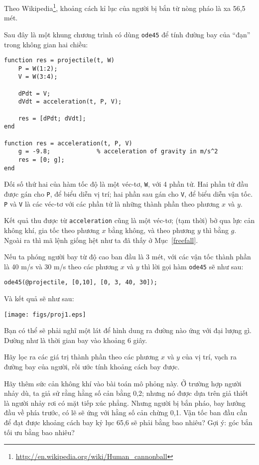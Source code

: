 \documentclass[12pt]{book}
\begin{document}
Theo Wikipedia\footnote{\url{http://en.wikipedia.org/wiki/Human_cannonball}},
khoảng cách kỉ lục của người bị bắn từ nòng pháo là xa 56,5 mét.

Sau đây là một khung chương trình có dùng {\tt ode45} để tính đường bay của ``đạn'' trong
không gian hai chiều:

\begin{verbatim}
function res = projectile(t, W)
    P = W(1:2);
    V = W(3:4);

    dPdt = V;                          
    dVdt = acceleration(t, P, V);

    res = [dPdt; dVdt];
end

function res = acceleration(t, P, V)
    g = -9.8;             % acceleration of gravity in m/s^2
    res = [0; g];
end
\end{verbatim}
%
Đối số thứ hai của hàm tốc độ là một véc-tơ, {\tt W}, với
4 phần tử. Hai phần tử đầu được gán cho {\tt P}, để biểu
diễn vị trí; hai phần sau gán cho {\tt V}, để biểu diễn
vận tốc. {\tt P} và {\tt V} là các véc-tơ với các phần tử
là những thành phần theo phương $x$ và $y$.

Kết quả thu được từ {\tt acceleration} cũng là một véc-tơ; 
(tạm thời) bở qua lực cản không khí, gia tốc theo phương
$x$ bằng không, và theo phương $y$ thì bằng $g$. 
Ngoài ra thì mã lệnh giống hệt như ta đã thấy ở
Mục~\ref{freefall}.

Nếu ta phóng người bay từ độ cao ban đầu là 3 mét, với các
vận tốc thành phần là 40 m/s và 30 m/s theo các phương $x$ 
và $y$ thì lời gọi hàm {\tt ode45} sẽ như sau:

\begin{verbatim}
ode45(@projectile, [0,10], [0, 3, 40, 30]);
\end{verbatim}
%
Và kết quả sẽ như sau:

\centerline{\texttt{[image: figs/proj1.eps]}}

Bạn có thể sẽ phải nghĩ một lát để hình dung ra đường nào
ứng với đại lượng gì. Dường như là thời gian bay vào khoảng
6 giây.

\begin{ex}
Hãy lọc ra các giá trị thành phần theo các phương $x$ và $y$ 
của vị trí, vạch ra đường bay của người, rồi ước tính khoảng
cách bay được.
\end{ex}

\begin{ex}
Hãy thêm sức cản không khí vào bài toán mô phỏng này. Ở
trường hợp người nhảy dù, ta giả sử rằng hằng số cản bằng
0,2; nhưng nó được dựa trên giả thiết là người nhảy rơi
có mặt tiếp xúc phẳng. Nhưng người bị bắn pháo, bay 
hướng đầu về phía trước, có lẽ sẽ ứng với hằng số cản
chừng 0,1. Vận tốc ban đầu cần để đạt được khoảng cách
bay kỷ lục 65,6 sẽ phải bằng bao nhiêu? Gợi ý: góc bắn
tối ưu bằng bao nhiêu?
\end{ex}
\end{document}
